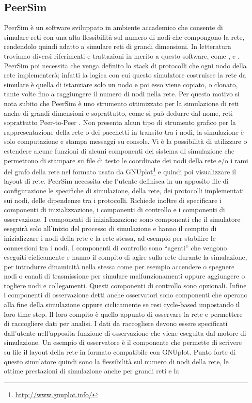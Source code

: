 \subsection{PeerSim}
PeerSim è un software sviluppato in ambiente accademico che consente di simulare reti con una alta flessibilità sul numero di nodi che compongono la rete, rendendolo quindi adatto a simulare reti di grandi dimensioni. In letteratura troviamo diversi riferimenti e trattazioni in merito a questo software, come \cite{montresor2010-peersim}, \cite{montresor2009-peersim_scalabile} e \cite{montresor2009-peersimP2P}. PeerSim poi necessita che venga definito lo stack di protocolli che ogni nodo della rete implementerà; infatti la logica con cui questo simulatore costruisce la rete da simulare è quella di istanziare solo un nodo e poi esso viene copiato, o clonato, tante volte fino a raggiungere il numero di nodi nella rete. Per questo motivo si nota subito  che PeerSim è uno strumento ottimizzato per la simulazione di reti anche di grandi dimensioni e soprattutto, come si può dedurre dal nome, reti soprattutto Peer-to-Peer \cite{montresor2009-peersimP2P}. Non presenta alcun tipo di strumento grafico per la rappresentazione della rete o dei pacchetti in transito tra i nodi, la simulazione è solo computazione e stampa messaggi su console. Vi è la possibilità di utilizzare o estendere alcune funzioni di alcuni componenti del sistema di simulazione che permettono di stampare su file di testo le coordinate dei nodi della rete e/o i rami del grafo della rete nel formato usato da GNUplot\footnote{\url{http://www.gnuplot.info/}} e quindi poi visualizzare il layout di rete. PeerSim necessita che l'utente definisca in un apposito file di configurazione le specifiche di simulazione, della rete, dei protocolli implementati sui nodi, delle dipendenze tra i protocolli. Richiede inoltre di specificare i componenti di inizializzazione, i componenti di controllo e i componenti di osservazione. I componenti di inizializzazione sono componenti che il simulatore eseguirà solo all'inizio del processo di simulazione e hanno il compito di inizializzare i nodi della rete e la rete stessa, ad esempio per stabilire le connessioni tra i nodi. I componenti di controllo sono “agenti” che vengono eseguiti ciclicamente e hanno il compito di agire sulla rete durante la simulazione, per introdurre dinamicità nella stessa come per esempio accendere o spegnere nodi o canali di trasmissione per simulare malfunzionamenti oppure aggiungere o togliere nodi e collegamenti. Questi componenti di controllo sono opzionali. Infine i componenti di osservazione detti anche osservatori sono componenti che operano alla fine della simulazione oppure ciclicamente se resi cycle-based impostando il loro time step. Il loro compito è quello appunto di osservare la rete e permettere di raccogliere dati per analisi. I dati da raccogliere devono essere specificati dall'utente nell'apposita funzione di osservazione che viene eseguita dal motore di simulazione. Un esempio di osservatore è il componente che permette di scrivere su file il layout della rete in formato compatibile con GNUplot. Punto forte di questo simulatore quindi sono la flessibilità sul numero di nodi della rete, le ottime prestazioni di simulazione anche per grandi reti e la 